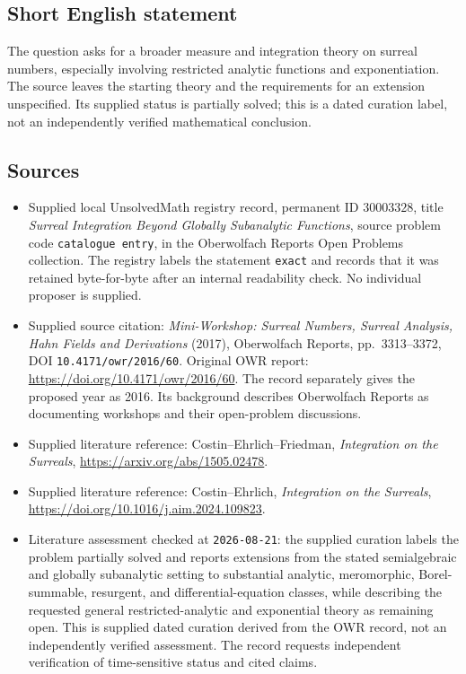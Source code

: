 \documentclass[11pt]{article}
\begin{document}
\subsection{Short English statement}
The question asks for a broader measure and integration theory on surreal numbers, especially involving restricted analytic functions and exponentiation. The source leaves the starting theory and the requirements for an extension unspecified. Its supplied status is partially solved; this is a dated curation label, not an independently verified mathematical conclusion.
\subsection{Sources}
\begin{itemize}
\item Supplied local UnsolvedMath registry record, permanent ID \(30003328\), title \emph{Surreal Integration Beyond Globally Subanalytic Functions}, source problem code \texttt{catalogue entry}, in the Oberwolfach Reports Open Problems collection. The registry labels the statement \texttt{exact} and records that it was retained byte-for-byte after an internal readability check. No individual proposer is supplied.
\item Supplied source citation: \emph{Mini-Workshop: Surreal Numbers, Surreal Analysis, Hahn Fields and Derivations} (2017), Oberwolfach Reports, pp.\ 3313--3372, DOI \texttt{10.4171/owr/2016/60}. Original OWR report: \url{https://doi.org/10.4171/owr/2016/60}. The record separately gives the proposed year as 2016. Its background describes Oberwolfach Reports as documenting workshops and their open-problem discussions.
\item Supplied literature reference: Costin--Ehrlich--Friedman, \emph{Integration on the Surreals}, \url{https://arxiv.org/abs/1505.02478}.
\item Supplied literature reference: Costin--Ehrlich, \emph{Integration on the Surreals}, \url{https://doi.org/10.1016/j.aim.2024.109823}.
\item Literature assessment checked at \texttt{2026-08-21}: the supplied curation labels the problem partially solved and reports extensions from the stated semialgebraic and globally subanalytic setting to substantial analytic, meromorphic, Borel-summable, resurgent, and differential-equation classes, while describing the requested general restricted-analytic and exponential theory as remaining open. This is supplied dated curation derived from the OWR record, not an independently verified assessment. The record requests independent verification of time-sensitive status and cited claims.
\end{itemize}
\end{document}
